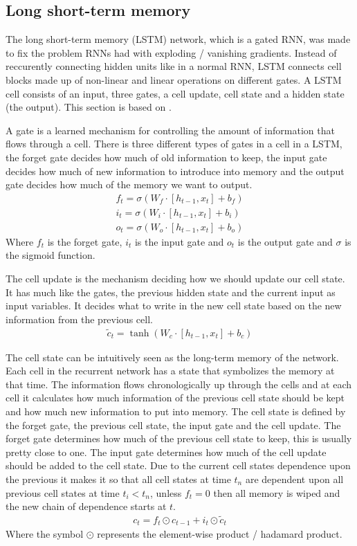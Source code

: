 \documentclass[a4paper,12pt]{article}
\begin{document}
\subsection{Long short-term memory}
The long short-term memory (LSTM) network, which is a gated RNN, was made to fix the problem RNNs had with exploding / vanishing gradients. 
Instead of reccurently connecting hidden units like in a normal RNN, LSTM connects cell blocks made up of non-linear and linear operations on different gates.
A LSTM cell consists of an input, three gates, a cell update, cell state and a hidden state (the output). This section is based on \cite{goodfellow2016lstm}.

A gate is a learned mechanism for controlling the amount of information that flows through a cell.
There is three different types of gates in a cell in a LSTM, the forget gate decides how much of old information to keep, the input gate decides how much of new information to introduce into memory and the output gate decides how much of the memory we want to output.
\begin{align}
  f_t = \sigma(W_f \cdot [h_{t-1}, x_t] + b_f) \\
  i_t = \sigma(W_i \cdot [h_{t-1}, x_t] + b_i) \\
  o_t = \sigma(W_o \cdot [h_{t-1}, x_t] + b_o) 
\end{align}
Where $f_t$ is the forget gate, $i_t$ is the input gate and $o_t$ is the output gate and $\sigma$ is the sigmoid function.

The cell update is the mechanism deciding how we should update our cell state. It has much like the gates, the previous hidden state and the current input as input variables. It decides what to write in the new cell state based on the new information from the previous cell.
\begin{align}
  \tilde{c}_t = \tanh(W_c \cdot [h_{t-1}, x_t] + b_c)
\end{align}

The cell state can be intuitively seen as the long-term memory of the network. Each cell in the recurrent network has a state that symbolizes the memory at that time. The information flows chronologically up through the cells and at each cell it calculates how much information of the previous cell state should be kept and how much new information to put into memory. 
The cell state is defined by the forget gate, the previous cell state, the input gate and the cell update. The forget gate determines how much of the previous cell state to keep, this is usually pretty close to one. The input gate determines how much of the cell update should be added to the cell state.
Due to the current cell states dependence upon the previous it makes it so that all cell states at time  $t_n$ are dependent upon all previous cell states at time $t_i<t_n$, unless $f_t=0$  then all memory is wiped and the new chain of dependence starts at $t$.
\begin{align}
  c_t = f_t \odot c_{t-1} + i_t \odot \tilde{c}_t
\end{align}
Where the symbol $\odot$ represents the element-wise product / hadamard product.
\end{document}

